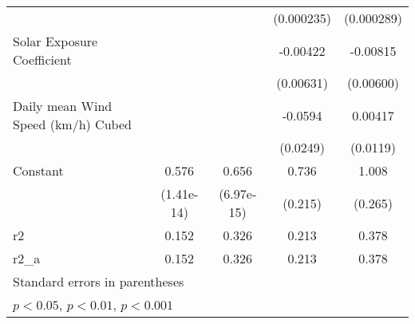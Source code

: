 {\begin{tabular}{l*{4}{c}}
                    &                     &                     &  (0.000235)         &  (0.000289)         \\
[1em]
Solar Exposure Coefficient&                     &                     &    -0.00422         &    -0.00815         \\
                    &                     &                     &   (0.00631)         &   (0.00600)         \\
[1em]
Daily mean Wind Speed (km/h) Cubed&                     &                     &     -0.0594         &     0.00417         \\
                    &                     &                     &    (0.0249)         &    (0.0119)         \\
[1em]
Constant            &       0.576\sym{***}&       0.656\sym{***}&       0.736\sym{*}  &       1.008\sym{*}  \\
                    &  (1.41e-14)         &  (6.97e-15)         &     (0.215)         &     (0.265)         \\
\hline
r2                  &       0.152         &       0.326         &       0.213         &       0.378         \\
r2\_a                &       0.152         &       0.326         &       0.213         &       0.378         \\
\hline\hline
\multicolumn{5}{l}{\footnotesize Standard errors in parentheses}\\
\multicolumn{5}{l}{\footnotesize \sym{*} \(p<0.05\), \sym{**} \(p<0.01\), \sym{***} \(p<0.001\)}\\
\end{tabular}
}
